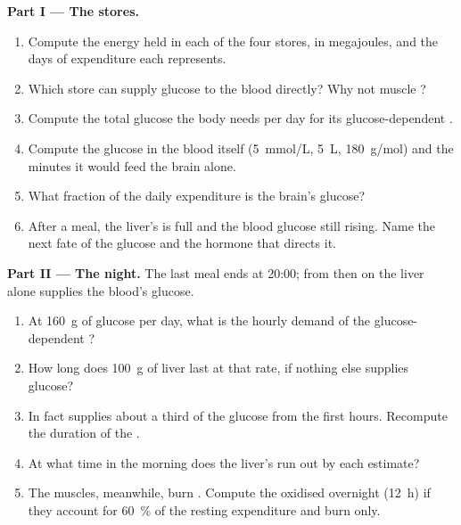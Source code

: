 \begin{problem}
\medskip
\noindent\textbf{Part I --- The stores.}
\begin{enumerate}
  \item Compute the energy held in each of the four stores, in
        megajoules, and the days of expenditure each represents.
  \item Which store can supply glucose to the blood directly? Why not
        muscle ?
  \item Compute the total glucose the body needs per day for its
        glucose-dependent .
  \item Compute the glucose in the blood itself (\qty{5}{mmol/L},
        \qty{5}{L}, \qty{180}{g/mol}) and the minutes it would feed
        the brain alone.
  \item What fraction of the daily expenditure is the brain's glucose?
  \item After a meal, the liver's  is full and the blood
        glucose still rising. Name the next fate of the glucose and
        the hormone that directs it.
\end{enumerate}

\medskip
\noindent\textbf{Part II --- The night.}
The last meal ends at 20:00; from then on the liver alone supplies the
blood's glucose.
\begin{enumerate}[resume]
  \item At \qty{160}{g} of glucose per day, what is the hourly demand
        of the glucose-dependent ?
  \item How long does \qty{100}{g} of liver  last at that
        rate, if nothing else supplies glucose?
  \item In fact  supplies about a third of the glucose
        from the first hours. Recompute the duration of the .
  \item At what time in the morning does the liver's  run out
        by each estimate?
  \item The muscles, meanwhile, burn . Compute the 
        oxidised overnight (\qty{12}{h}) if they account for
        \qty{60}{\%} of the resting expenditure and burn  only.
\end{enumerate}


\end{problem}
